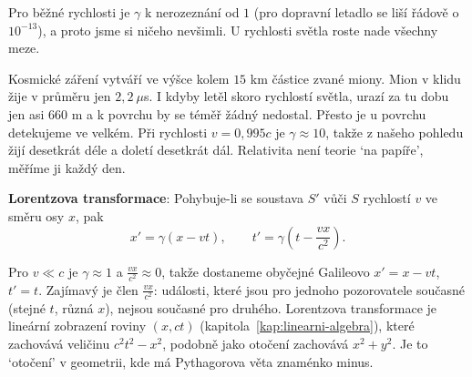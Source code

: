 \begin{center}
\end{center}

Pro běžné rychlosti je $\gamma$ k nerozeznání od $1$ (pro dopravní letadlo se liší řádově o $10^{-13}$), a proto jsme si ničeho nevšimli. U rychlosti světla roste nade všechny meze.

\begin{example}[ (miony)]
  Kosmické záření vytváří ve výšce kolem $15$ km částice zvané miony. Mion v klidu žije v průměru jen $2{,}2\ \mu$s. I kdyby letěl skoro rychlostí světla, urazí za tu dobu jen asi $660$ m a k povrchu by se téměř žádný nedostal. Přesto je u povrchu detekujeme ve velkém. Při rychlosti $v = 0{,}995c$ je $\gamma\approx 10$, takže z našeho pohledu žijí desetkrát déle a doletí desetkrát dál. Relativita není teorie `na papíře', měříme ji každý den.
\end{example}

\begin{definitionbox}
  \textbf{Lorentzova transformace}: Pohybuje-li se soustava $S'$ vůči $S$ rychlostí $v$ ve směru osy $x$, pak
  \begin{equation*}
    x' = \gamma(x - vt),\qquad t' = \gamma\left(t - \frac{vx}{c^2}\right).
  \end{equation*}
\end{definitionbox}

Pro $v\ll c$ je $\gamma\approx 1$ a $\frac{vx}{c^2}\approx 0$, takže dostaneme obyčejné Galileovo $x' = x - vt$, $t' = t$. Zajímavý je člen $\frac{vx}{c^2}$: události, které jsou pro jednoho pozorovatele současné (stejné $t$, různá $x$), nejsou současné pro druhého. Lorentzova transformace je lineární zobrazení roviny $(x, ct)$ (kapitola~\ref{kap:linearni-algebra}), které zachovává veličinu $c^2t^2 - x^2$, podobně jako otočení zachovává $x^2 + y^2$. Je to `otočení' v geometrii, kde má Pythagorova věta znaménko minus.


